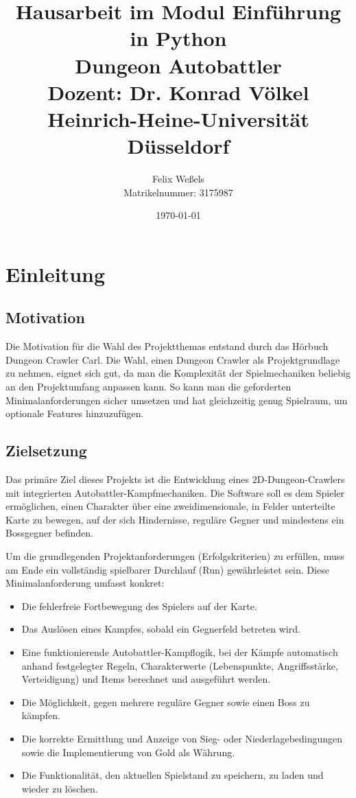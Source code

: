 \documentclass[12pt, a4paper]{article}
\title{
    \vspace{-2cm}
    \large Hausarbeit im Modul Einführung in Python \\
    \vspace{0.5cm}
    \textbf{\huge Dungeon Autobattler} \\
    \vspace{0.5cm}
    \large Dozent: Dr. Konrad Völkel \\
    Heinrich-Heine-Universität Düsseldorf
}
\author{Felix Weßels \\ Matrikelnummer: 3175987}
\date{\today}
\begin{document}
\maketitle
\thispagestyle{empty}

\newpage
\setcounter{page}{1}

\tableofcontents
\newpage

\section{Einleitung}
\subsection{Motivation}
Die Motivation für die Wahl des Projektthemas entstand durch das Hörbuch Dungeon Crawler Carl.
Die Wahl, einen Dungeon Crawler als Projektgrundlage zu nehmen, eignet sich gut, da man die Komplexität der Spielmechaniken beliebig an den Projektumfang anpassen kann.
So kann man die geforderten Minimalanforderungen sicher umsetzen und hat gleichzeitig genug Spielraum, um optionale Features hinzuzufügen.

\subsection{Zielsetzung}
Das primäre Ziel dieses Projekts ist die Entwicklung eines 2D-Dungeon-Crawlers mit integrierten Autobattler-Kampfmechaniken.
Die Software soll es dem Spieler ermöglichen, einen Charakter über eine zweidimensionale, in Felder unterteilte Karte zu bewegen, auf der sich Hindernisse, reguläre Gegner und mindestens ein Bossgegner befinden.

Um die grundlegenden Projektanforderungen (Erfolgskriterien) zu erfüllen, muss am Ende ein vollständig spielbarer Durchlauf (Run) gewährleistet sein.
Diese Minimalanforderung umfasst konkret:
\begin{itemize}
    \item Die fehlerfreie Fortbewegung des Spielers auf der Karte.
    \item Das Auslösen eines Kampfes, sobald ein Gegnerfeld betreten wird.
    \item Eine funktionierende Autobattler-Kampflogik, bei der Kämpfe automatisch anhand festgelegter Regeln, Charakterwerte (Lebenspunkte, Angriffsstärke, Verteidigung) und Items berechnet und ausgeführt werden.
    \item Die Möglichkeit, gegen mehrere reguläre Gegner sowie einen Boss zu kämpfen.
    \item Die korrekte Ermittlung und Anzeige von Sieg- oder Niederlagebedingungen sowie die Implementierung von Gold als Währung.
    \item Die Funktionalität, den aktuellen Spielstand zu speichern, zu laden und wieder zu löschen.
\end{itemize}
\end{document}
